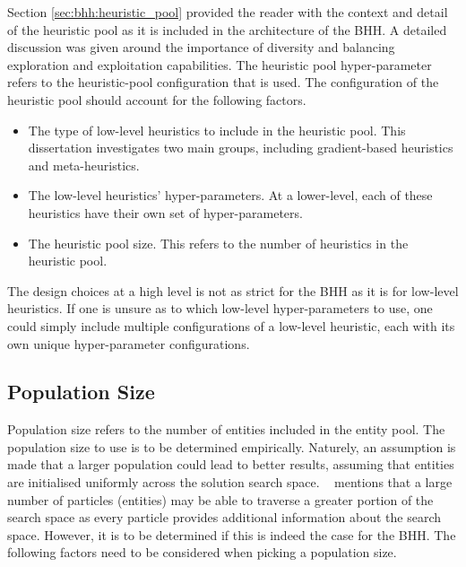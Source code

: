 Section \ref{sec:bhh:heuristic_pool} provided the reader with the context and detail of the heuristic pool as it is included in the architecture of the \acs{BHH}. A detailed discussion was given around the importance of diversity and balancing exploration and exploitation capabilities. The heuristic pool hyper-parameter refers to the heuristic-pool configuration that is used. The configuration of the heuristic pool should account for the following factors.

\begin{itemize}
      \item The type of low-level heuristics to include in the heuristic pool. This dissertation investigates two main groups, including gradient-based heuristics and meta-heuristics.

      \item The low-level heuristics' hyper-parameters. At a lower-level, each of these heuristics have their own set of hyper-parameters.

      \item The heuristic pool size. This refers to the number of heuristics in the heuristic pool.
\end{itemize}

The design choices at a high level is not as strict for the \acs{BHH} as it is for low-level heuristics. If one is unsure as to which low-level hyper-parameters to use, one could simply include multiple configurations of a low-level heuristic, each with its own unique hyper-parameter configurations.


\subsection{Population Size}\label{sec:bhh:hyper_parameters:population_size}

Population size refers to the number of entities included in the entity pool. The population size to use is to be determined empirically. Naturely, an assumption is made that a larger population could lead to better results, assuming that entities are initialised uniformly across the solution search space. \citeauthor{ref:oldewage:2017}~\cite{ref:oldewage:2017} mentions that a large number of particles (entities) may be able to traverse a greater portion of the search space as every particle provides additional information about the search space. However, it is to be determined if this is indeed the case for the \acs{BHH}. The following factors need to be considered when picking a population size.

